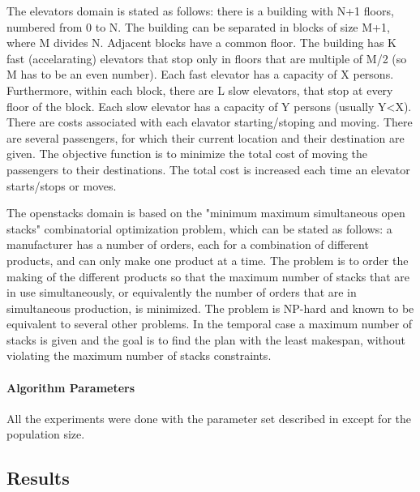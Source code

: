 \documentclass{sig-alternate}
\begin{document}
The elevators domain is stated as follows: there is a building with N+1 floors, numbered from 0 to N. The building can be separated in blocks of size M+1, where M divides N. Adjacent blocks have a common floor. The building has K fast (accelarating) elevators that stop only in floors that are multiple of M/2 (so M has to be an even number). Each fast elevator has a capacity of X persons. Furthermore, within each block, there are L slow elevators, that stop at every floor of the block. Each slow elevator has a capacity of Y persons (usually Y<X).
There are costs associated with each elavator starting/stoping and moving. There are several passengers, for which their current location and their destination are given.
The objective function is to minimize the total cost of moving the passengers to their destinations. The total cost is increased each time an elevator starts/stops or moves.

The openstacks domain is based on the "minimum maximum simultaneous open stacks" combinatorial optimization problem, which can be stated as follows: a manufacturer has a number of orders, each for a combination of different products, and can only make one product at a time. The problem is to order the making of the different products so that the maximum number of stacks that are in use simultaneously, or equivalently the number of orders that are in simultaneous production, is minimized. The problem is NP-hard and known to be equivalent to several other problems. In the temporal case a maximum number of stacks is given and the goal is to find the plan with the least makespan, without violating the maximum number of stacks constraints.


\paragraph{Algorithm Parameters} %

All the experiments were done with the parameter set described in \cite{dae:icaps2010} except for the population size.


\subsection{Results}

\end{document}
